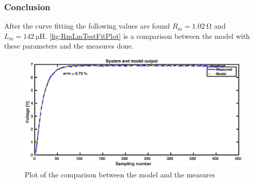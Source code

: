 \subsubsection*{Conclusion}

After the curve fitting the following values are found $R_m=\SI{1.02}{\ohm}$ and $L_m=\SI{142}{\micro\henry}$. \autoref{fig:RmLmTestFitPlot} is a comparison between the model with these parameters and the measures done.

\begin{figure}[htbp]
	\centering
	\includegraphics[width=\textwidth]{figures/appendix/Motor&GearTests/RmLmFitPlot}
	\caption{Plot of the comparison between the model and the measures}\label{fig:RmLmTestFitPlot}
\end{figure}
